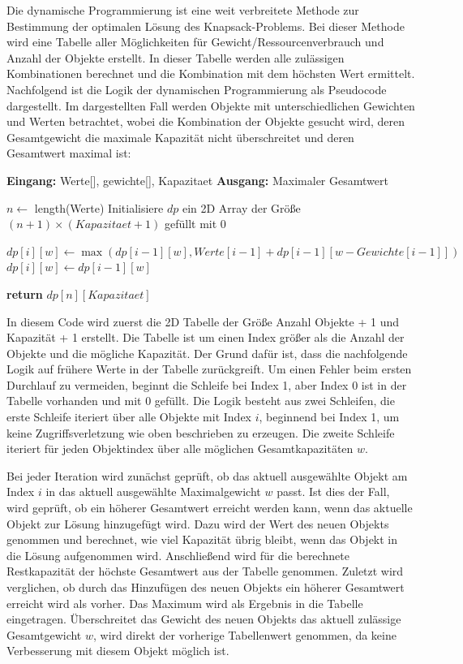Die dynamische Programmierung ist eine weit verbreitete Methode zur Bestimmung der optimalen Lösung des Knapsack-Problems. Bei dieser Methode wird eine Tabelle aller Möglichkeiten für Gewicht/Ressourcenverbrauch und Anzahl der Objekte erstellt. In dieser Tabelle werden alle zulässigen Kombinationen berechnet und die Kombination mit dem höchsten Wert ermittelt. Nachfolgend ist die Logik der dynamischen Programmierung als Pseudocode dargestellt. Im dargestellten Fall werden Objekte mit unterschiedlichen Gewichten und Werten betrachtet, wobei die Kombination der Objekte gesucht wird, deren Gesamtgewicht die maximale Kapazität nicht überschreitet und deren Gesamtwert maximal ist:

\begin{algorithmic}
    \State  \textbf{Eingang:} Werte[], gewichte[], Kapazitaet
    \State  \textbf{Ausgang:} Maximaler Gesamtwert
    
    \State  $n \leftarrow$ length(Werte)
    \State  Initialisiere $dp$ ein 2D Array der Größe $(n+1) \times (Kapazitaet+1)$ gefüllt mit 0
    
                \State $dp[i][w] \leftarrow \max(dp[i-1][w], Werte[i-1] + dp[i-1][w - Gewichte[i-1]])$
            \Else
                \State  $dp[i][w] \leftarrow dp[i-1][w]$
            \EndIf
        \EndFor
    \EndFor
    
    \State  \textbf{return} $dp[n][Kapazitaet]$
\end{algorithmic}

In diesem Code wird zuerst die 2D Tabelle der Größe Anzahl Objekte + 1 und Kapazität + 1 erstellt. Die Tabelle ist um einen Index größer als die Anzahl der Objekte und die mögliche Kapazität. Der Grund dafür ist, dass die nachfolgende Logik auf frühere Werte in der Tabelle zurückgreift. Um einen Fehler beim ersten Durchlauf zu vermeiden, beginnt die Schleife bei Index 1, aber Index 0 ist in der Tabelle vorhanden und mit 0 gefüllt. Die Logik besteht aus zwei Schleifen, die erste Schleife iteriert über alle Objekte mit Index $i$, beginnend bei Index 1, um keine Zugriffsverletzung wie oben beschrieben zu erzeugen. Die zweite Schleife iteriert für jeden Objektindex über alle möglichen Gesamtkapazitäten $ w $. 

Bei jeder Iteration wird zunächst geprüft, ob das aktuell ausgewählte Objekt am Index $ i $ in das aktuell ausgewählte Maximalgewicht $ w $ passt. Ist dies der Fall, wird geprüft, ob ein höherer Gesamtwert erreicht werden kann, wenn das aktuelle Objekt zur Lösung hinzugefügt wird. Dazu wird der Wert des neuen Objekts genommen und berechnet, wie viel Kapazität übrig bleibt, wenn das Objekt in die Lösung aufgenommen wird. Anschließend wird für die berechnete Restkapazität der höchste Gesamtwert aus der Tabelle genommen. Zuletzt wird verglichen, ob durch das Hinzufügen des neuen Objekts ein höherer Gesamtwert erreicht wird als vorher. Das Maximum wird als Ergebnis in die Tabelle eingetragen. Überschreitet das Gewicht des neuen Objekts das aktuell zulässige Gesamtgewicht $ w $, wird direkt der vorherige Tabellenwert genommen, da keine Verbesserung mit diesem Objekt möglich ist.

